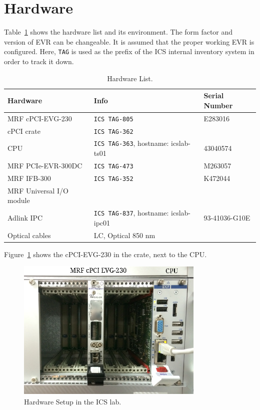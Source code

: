 \documentclass[11pt
  , a4paper
  , article
  , oneside
  , showtrims
]{memoir}
\begin{document}
\section{Hardware}
Table~\ref{table:hwlist} shows the hardware list and its environment. The form factor and version of EVR can be changeable. It is assumed that the proper working EVR is configured. Here, \texttt{TAG} is used as the prefix of the ICS internal inventory system in order to track it down.
\begin{table}[!hb]
  \centering
  \begin{tabular}{l|l|l}
    \toprule
    Hardware                 & Info                                         & Serial Number \\\midrule
    MRF cPCI-EVG-230         & \texttt{ICS TAG-805}                         & E283016       \\\midrule
    cPCI crate               & \texttt{ICS TAG-362}                         &               \\\midrule
    CPU                      & \texttt{ICS TAG-363}, hostname: icslab-ts01  & 43040574      \\\midrule
    MRF PCIe-EVR-300DC       & \texttt{ICS TAG-473}                         & M263057       \\\midrule
    MRF IFB-300              & \texttt{ICS TAG-352}                         & K472044       \\\midrule
    MRF Universal I/O module &                                              &               \\\midrule
    Adlink IPC               & \texttt{ICS TAG-837}, hostname: icslab-ipc01 & 93-41036-G10E \\\midrule
    Optical cables           & LC, Optical 850 nm                           &               \\\bottomrule
  \end{tabular}
  \caption[]{Hardware List.}
  \label{table:hwlist}
\end{table}


Figure~\ref{fig:hw-setup} shows the cPCI-EVG-230 in the crate, next to the CPU.
\begin{figure}[!b]
  \centering
  \includegraphics[width=0.8\textwidth]{./pictures/evgoncrate.png}
  \caption{Hardware Setup in the ICS lab.}
  \label{fig:hw-setup}
\end{figure}
\end{document}
